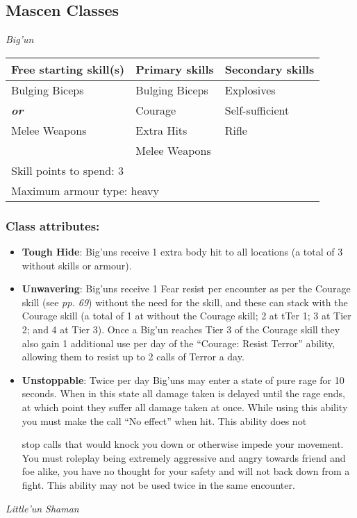 \subsection{Mascen Classes}

\textit{Big'un}

\begin{table}[H]
\begin{tabular}{|l|l|l|} \hline 
Free starting skill(s) & Primary skills & Secondary skills \\
 \hline Bulging Biceps & Bulging Biceps & Explosives \\
 \hline \textbf{\textit{or}} & Courage & Self-sufficient \\
 \hline Melee Weapons & Extra Hits & Rifle \\
 \hline  & Melee Weapons &  \\
 \hline \multicolumn{3}{|l|}{Skill points to spend: 3} \\
 \hline \multicolumn{3}{|l|}{Maximum armour type: heavy} \\
 \hline \end{tabular}

\end{table}

\subsubsection{Class attributes:}

\begin{itemize}
\item \textbf{Tough Hide}: Big'uns receive 1 extra body hit to all locations (a total of 3 without skills or armour).

\item \textbf{Unwavering}: Big'uns receive 1 Fear resist per encounter as per the Courage skill (see \textit{pp. 69}) without the need for the skill, and these can stack with the Courage skill (a total of 1 at without the Courage skill; 2 at tTer 1; 3 at Tier 2; and 4 at Tier 3). Once a Big'un reaches Tier 3 of the Courage skill they also gain 1 additional use per day of the ``Courage: Resist Terror'' ability, allowing them to resist up to 2 calls of Terror a day.

\item \textbf{Unstoppable}: Twice per day Big'uns may enter a state of pure rage for 10 seconds. When in this state all damage taken is delayed until the rage ends, at which point they suffer all damage taken at once. While using this ability you must make the call ``No effect'' when hit. This ability does not

stop calls that would knock you down or otherwise impede your movement. You must roleplay being extremely aggressive and angry towards friend and foe alike, you have no thought for your safety and will not back down from a fight. This ability may not be used twice in the same encounter.

\end{itemize}
\textit{Little'un Shaman}

